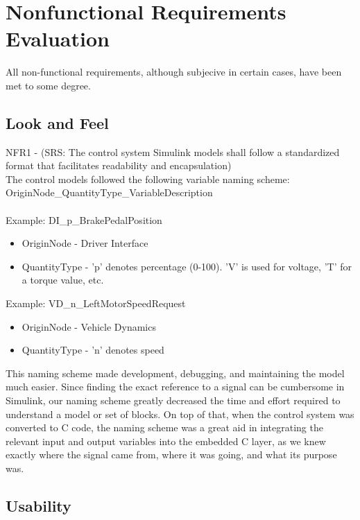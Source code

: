 \documentclass[12pt, titlepage]{article}
\begin{document}
\section{Nonfunctional Requirements Evaluation}

All non-functional requirements, although subjecive in certain cases, have been met to some degree.

\subsection{Look and Feel}
NFR1 - (SRS: The control system Simulink models shall follow a standardized
format that facilitates readability and encapsulation)\\

The control models followed the following variable naming scheme:\\
OriginNode\_QuantityType\_VariableDescription\\\\
Example: DI\_p\_BrakePedalPosition
\begin{itemize}
    \item OriginNode - Driver Interface
    \item QuantityType - 'p' denotes percentage (0-100). 'V' is used for voltage, 'T' for a torque value, etc.
\end{itemize}

Example: VD\_n\_LeftMotorSpeedRequest\\
\begin{itemize}
    \item OriginNode - Vehicle Dynamics
    \item QuantityType - 'n' denotes speed
\end{itemize}

This naming scheme made development, debugging, and maintaining the model much easier. Since finding the exact reference to a signal can be cumbersome in Simulink, our naming scheme greatly decreased the time and effort required to understand a model or set of blocks. On top of that, when the control system was converted to C code, the naming scheme was a great aid in integrating the relevant input and output variables into the embedded C layer, as we knew exactly where the signal came from, where it was going, and what its purpose was. 

\subsection{Usability}
\end{document}

